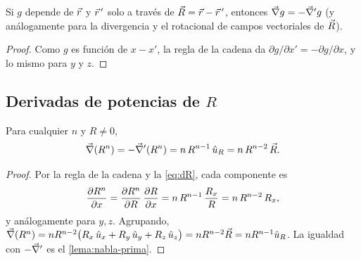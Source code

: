 \begin{lema}\label{lema:nabla-prima}
Si $g$ depende de $\vec{r}$ y $\vec{r}\,'$ solo a través de $\vec{R}=\vec{r}-\vec{r}\,'$,
entonces $\vec{\nabla} g=-\vec{\nabla}'g$ (y análogamente para la divergencia y el rotacional de
campos vectoriales de $\vec{R}$).
\end{lema}
\begin{proof}
Como $g$ es función de $x-x'$, la regla de la cadena da
$\partial g/\partial x'=-\partial g/\partial x$, y lo mismo para $y$ y $z$.
\end{proof}

\subsection{Derivadas de potencias de $R$}\label{sec:derivadas-R}
\begin{proposicion}[Gradiente de $R^{n}$]\label{prop:grad-Rn}
Para cualquier $n$ y $R\neq0$,
\begin{equation}\label{eq:grad-Rn}
  \vec{\nabla}(R^{n})=-\vec{\nabla}'(R^{n})=n\,R^{n-1}\,\hat{u}_{R}=n\,R^{n-2}\,\vec{R}.
\end{equation}
\end{proposicion}
\begin{proof}
Por la regla de la cadena y la \cref{eq:dR}, cada componente es
\[
  \frac{\partial R^{n}}{\partial x}=\frac{\partial R^{n}}{\partial R}\,\frac{\partial R}{\partial x}=n\,R^{n-1}\,\frac{R_x}{R}=n\,R^{n-2}\,R_x ,
\]
y análogamente para $y,z$. Agrupando, $\vec{\nabla}(R^{n})=nR^{n-2}\bigl(R_x\,\hat{u}_{x}+R_y\,\hat{u}_{y}+R_z\,\hat{u}_{z}\bigr)=nR^{n-2}\vec{R}=nR^{n-1}\hat{u}_{R}$.
La igualdad con $-\vec{\nabla}'$ es el \cref{lema:nabla-prima}.
\end{proof}

